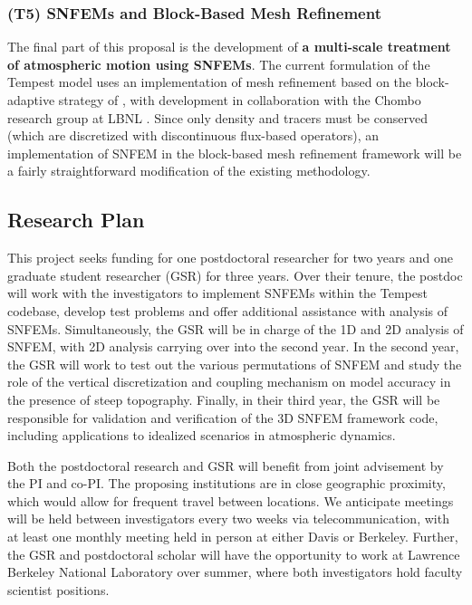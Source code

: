 \documentclass[11pt]{article}
\begin{document}
\vspace{-0.4cm}
\subsubsection{(T5) SNFEMs and Block-Based Mesh Refinement}

The final part of this proposal is the development of \textbf{a multi-scale treatment of atmospheric motion using SNFEMs}.  The current formulation of the Tempest model uses an implementation of mesh refinement based on the block-adaptive strategy of \cite{MJBPC1989JCP}, with development in collaboration with the Chombo research group at LBNL \cite{ChomboDesign}.  Since only density and tracers must be conserved (which are discretized with discontinuous flux-based operators), an implementation of SNFEM in the block-based mesh refinement framework will be a fairly straightforward modification of the existing methodology.

\subsection{Research Plan} \label{sec:ResearchPlan}

This project seeks funding for one postdoctoral researcher for two years and one graduate student researcher (GSR) for three years.  Over their tenure, the postdoc will work with the investigators to implement SNFEMs within the Tempest codebase, develop test problems and offer additional assistance with analysis of SNFEMs.  Simultaneously, the GSR will be in charge of the 1D and 2D analysis of SNFEM, with 2D analysis carrying over into the second year.  In the second year, the GSR will work to test out the various permutations of SNFEM and study the role of the vertical discretization and coupling mechanism on model accuracy in the presence of steep topography.  Finally, in their third year, the GSR will be responsible for validation and verification of the 3D SNFEM framework code, including applications to idealized scenarios in atmospheric dynamics.  

Both the postdoctoral research and GSR will benefit from joint advisement by the PI and co-PI.  The proposing institutions are in close geographic proximity, which would allow for frequent travel between locations.  We anticipate meetings will be held between investigators every two weeks via telecommunication, with at least one monthly meeting held in person at either Davis or Berkeley.  Further, the GSR and postdoctoral scholar will have the opportunity to work at Lawrence Berkeley National Laboratory over summer, where both investigators hold faculty scientist positions.
\end{document}
